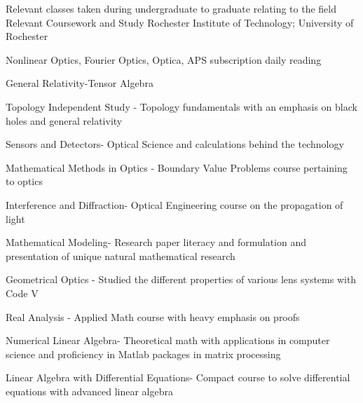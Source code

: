 \begin{cventries}
    \cventry
    {Relevant classes taken during undergraduate to graduate relating to the field}
    {Relevant Coursework and Study}
    {Rochester Institute of Technology; University of Rochester}
    {}
    {
      \begin{cvitems}
        \item{Nonlinear Optics, Fourier Optics, Optica, APS subscription daily reading}
        \item{General Relativity-Tensor Algebra}
        \item {Topology Independent Study - Topology fundamentals with an emphasis on black holes and general relativity}
        \item{Sensors and Detectors- Optical Science and calculations behind the technology}
        \item {Mathematical Methods in Optics - Boundary Value Problems course pertaining to optics}
        \item {Interference and Diffraction- Optical Engineering course on the propagation of light}
        \item {Mathematical Modeling- Research paper literacy and formulation and presentation of unique natural mathematical research}
        \item {Geometrical Optics - Studied the different properties of various lens systems with Code V}
        \item {Real Analysis - Applied Math course with heavy emphasis on proofs}
        \item {Numerical Linear Algebra- Theoretical math with applications in computer science and proficiency in Matlab packages in matrix processing}
        \item {Linear Algebra with Differential Equations- Compact course to solve differential equations with advanced linear algebra}
      \end{cvitems}
    }



\end{cventries}
